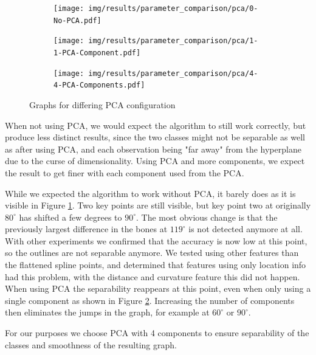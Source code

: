 \documentclass[pdftex,12pt,a4paper]{report}
\begin{document}
 \begin{figure}[h]
 	\centering
 	\begin{subfigure}[b]{0.32\textwidth}
 		\centering
 		\texttt{[image: img/results/parameter\_comparison/pca/0-No-PCA.pdf]}
 		\label{fig:pca-0}
 	\end{subfigure}
 	\begin{subfigure}[b]{0.32\textwidth}
 		\centering
 		\texttt{[image: img/results/parameter\_comparison/pca/1-1-PCA-Component.pdf]}
 		\label{fig:pca-1}
 	\end{subfigure}
 	\begin{subfigure}[b]{0.32\textwidth}
 		\centering
 		\texttt{[image: img/results/parameter\_comparison/pca/4-4-PCA-Components.pdf]}
 		\label{fig:pca-2}
 	\end{subfigure}
 	\caption{Graphs for differing PCA configuration}
 	\label{fig:pca}
 \end{figure}

When not using PCA, we would expect the algorithm to still work correctly, but produce less distinct results, since the two classes might not be separable as well as after using PCA, and each observation being "far away" from the hyperplane due to the curse of dimensionality. Using PCA and more components, we expect the result to get finer with each component used from the PCA.
 
While we expected the algorithm to work without PCA, it barely does as it is visible in Figure \ref{fig:pca-0}. Two key points are still visible, but key point two at originally $80^\circ$ has shifted a few degrees to $90^\circ$. The most obvious change is that the previously largest difference in the bones at $119^\circ$ is not detected anymore at all. With other experiments we confirmed that the accuracy is now low at this point, so the outlines are not separable anymore. We tested using other features than the flattened spline points, and determined that features using only location info had this problem, with the distance and curvature feature this did not happen. When using PCA the separability reappears at this point, even when only using a single component as shown in Figure \ref{fig:pca-1}. Increasing the number of components then eliminates the jumps in the graph, for example at $60^\circ$ or $90^\circ$.

For our purposes we choose PCA with 4 components to ensure separability of the classes and smoothness of the resulting graph.
\end{document}
